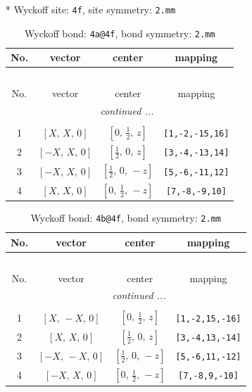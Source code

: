 \documentclass[fleqn,8pt]{jsarticle}
\begin{document}
* Wyckoff site: {\tt 4f}, site symmetry: {\tt 2.mm}
\renewcommand{\arraystretch}{1.2}
\begin{longtable}{cccc}
\caption{Wyckoff bond: {\tt 4a@4f}, bond symmetry: {\tt 2.mm}}
 \\
 \hline \hline
No. & vector & center & mapping \\ \hline \endfirsthead

\multicolumn{3}{l}{\tablename\ \thetable{}} \\
 \hline \hline
No. & vector & center & mapping \\ \hline \endhead

 \hline \hline
\multicolumn{3}{r}{\footnotesize\it continued ...} \\ \endfoot

 \hline \hline
\multicolumn{3}{r}{} \\ \endlastfoot

1 & $\left[ X,\, X,\, 0 \right]$ & $\left[ 0,\, \frac{1}{2},\, z \right]$ & {\tt [1,-2,-15,16]} \\ \hline
2 & $\left[ - X,\, X,\, 0 \right]$ & $\left[ \frac{1}{2},\, 0,\, z \right]$ & {\tt [3,-4,-13,14]} \\ \hline
3 & $\left[ - X,\, X,\, 0 \right]$ & $\left[ \frac{1}{2},\, 0,\, - z \right]$ & {\tt [5,-6,-11,12]} \\ \hline
4 & $\left[ X,\, X,\, 0 \right]$ & $\left[ 0,\, \frac{1}{2},\, - z \right]$ & {\tt [7,-8,-9,10]} \\
\end{longtable}
\renewcommand{\arraystretch}{1.2}
\begin{longtable}{cccc}
\caption{Wyckoff bond: {\tt 4b@4f}, bond symmetry: {\tt 2.mm}}
 \\
 \hline \hline
No. & vector & center & mapping \\ \hline \endfirsthead

\multicolumn{3}{l}{\tablename\ \thetable{}} \\
 \hline \hline
No. & vector & center & mapping \\ \hline \endhead

 \hline \hline
\multicolumn{3}{r}{\footnotesize\it continued ...} \\ \endfoot

 \hline \hline
\multicolumn{3}{r}{} \\ \endlastfoot

1 & $\left[ X,\, - X,\, 0 \right]$ & $\left[ 0,\, \frac{1}{2},\, z \right]$ & {\tt [1,-2,15,-16]} \\ \hline
2 & $\left[ X,\, X,\, 0 \right]$ & $\left[ \frac{1}{2},\, 0,\, z \right]$ & {\tt [3,-4,13,-14]} \\ \hline
3 & $\left[ - X,\, - X,\, 0 \right]$ & $\left[ \frac{1}{2},\, 0,\, - z \right]$ & {\tt [5,-6,11,-12]} \\ \hline
4 & $\left[ - X,\, X,\, 0 \right]$ & $\left[ 0,\, \frac{1}{2},\, - z \right]$ & {\tt [7,-8,9,-10]} \\
\end{longtable}
\end{document}
